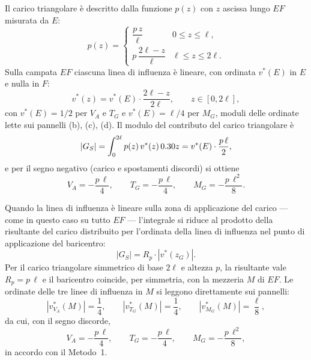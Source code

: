 \begin{esempio}
\begin{svolgimento}
		
		Il carico triangolare è descritto dalla funzione $p(z)$
		con $z$ ascissa lungo $EF$ misurata da $E$:
		\begin{equation*}
			p(z) = \begin{cases}
				\dfrac{p\,z}{\ell} & 0 \le z \le \ell, \\[6pt]
				p\,\dfrac{2\ell - z}{\ell} & \ell \le z \le 2\ell.
			\end{cases}
		\end{equation*}
		Sulla campata $EF$ ciascuna linea di influenza è lineare,
		con ordinata $v^*(E)$ in $E$ e nulla in $F$:
		\begin{equation*}
			v^*(z) = v^*(E) \cdot \dfrac{2\ell - z}{2\ell},
			\qquad z \in [0, 2\ell],
		\end{equation*}
		con $v^*(E) = 1/2$ per $V_A$ e $T_G$ e $v^*(E) = \ell/4$
		per $M_G$, moduli delle ordinate lette sui pannelli
		(b), (c), (d). Il modulo del contributo del carico
		triangolare è
		\begin{equation*}
			|G_S| = \int_0^{2\ell} p(z)\,v^*(z)\,0.30 z
			= v^*(E) \cdot \frac{p\,\ell}{2},
		\end{equation*}
		e per il segno negativo (carico e spostamenti discordi)
		si ottiene
		\begin{equation*}
			V_A = -\frac{p\,\ell}{4},
			\qquad
			T_G = -\frac{p\,\ell}{4},
			\qquad
			M_G = -\frac{p\,\ell^2}{8}.
		\end{equation*}
		
		
		Quando la linea di influenza è lineare sulla zona di
		applicazione del carico --- come in questo caso su tutto
		$EF$ --- l'integrale si riduce al prodotto della
		risultante del carico distribuito per l'ordinata della
		linea di influenza nel punto di applicazione del
		baricentro:
		\begin{equation*}
			|G_S| = R_p \cdot |v^*(z_G)|.
		\end{equation*}
		Per il carico triangolare simmetrico di base $2\ell$ e
		altezza $p$, la risultante vale $R_p = p\,\ell$ e il
		baricentro coincide, per simmetria, con la mezzeria $M$
		di $EF$. Le ordinate delle tre linee di influenza in $M$
		si leggono direttamente sui pannelli:
		\begin{equation*}
			|v^*_{V_A}(M)| = \frac{1}{4},
			\qquad
			|v^*_{T_G}(M)| = \frac{1}{4},
			\qquad
			|v^*_{M_G}(M)| = \frac{\ell}{8},
		\end{equation*}
		da cui, con il segno discorde,
		\begin{equation*}
			V_A = -\frac{p\,\ell}{4},
			\qquad
			T_G = -\frac{p\,\ell}{4},
			\qquad
			M_G = -\frac{p\,\ell^2}{8},
		\end{equation*}
		in accordo con il Metodo~1.
		

\end{svolgimento}
\end{esempio}
